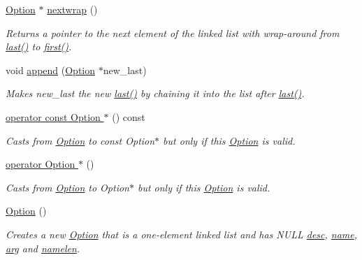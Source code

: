 \begin{DoxyCompactItemize}
\hyperlink{class_option_parser_1_1_option}{Option} $\ast$ \hyperlink{class_option_parser_1_1_option_a3c426f5fa1315b9b474286d7d2d1c277}{nextwrap} ()
\begin{DoxyCompactList}\small\item\em Returns a pointer to the next element of the linked list with wrap-\/around from \hyperlink{class_option_parser_1_1_option_a4c500ad0071e1dc9be2b2b234db71b1d}{last()} to \hyperlink{class_option_parser_1_1_option_aa5f751dbb4de499f2665d4d0b6238037}{first()}. \end{DoxyCompactList}\item 
void \hyperlink{class_option_parser_1_1_option_a47a6a9946633001b36826680252065df}{append} (\hyperlink{class_option_parser_1_1_option}{Option} $\ast$new\-\_\-last)
\begin{DoxyCompactList}\small\item\em Makes {\ttfamily new\-\_\-last} the new \hyperlink{class_option_parser_1_1_option_a4c500ad0071e1dc9be2b2b234db71b1d}{last()} by chaining it into the list after \hyperlink{class_option_parser_1_1_option_a4c500ad0071e1dc9be2b2b234db71b1d}{last()}. \end{DoxyCompactList}\item 
\hyperlink{class_option_parser_1_1_option_a52a071fc38974597b6673ab34725c8d5}{operator const Option $\ast$} () const 
\begin{DoxyCompactList}\small\item\em Casts from \hyperlink{class_option_parser_1_1_option}{Option} to const Option$\ast$ but only if this \hyperlink{class_option_parser_1_1_option}{Option} is valid. \end{DoxyCompactList}\item 
\hyperlink{class_option_parser_1_1_option_a3e135f163c812dbd1c954f8d8d9c8a6e}{operator Option $\ast$} ()
\begin{DoxyCompactList}\small\item\em Casts from \hyperlink{class_option_parser_1_1_option}{Option} to Option$\ast$ but only if this \hyperlink{class_option_parser_1_1_option}{Option} is valid. \end{DoxyCompactList}\item 
\hyperlink{class_option_parser_1_1_option_a688623720b4f2221a82a29014b856d95}{Option} ()
\begin{DoxyCompactList}\small\item\em Creates a new \hyperlink{class_option_parser_1_1_option}{Option} that is a one-\/element linked list and has N\-U\-L\-L \hyperlink{class_option_parser_1_1_option_a9ea2f4b0658ab175b7f0f0c204671fa9}{desc}, \hyperlink{class_option_parser_1_1_option_abea386c9b8b1a810a2eb776d338fdfab}{name}, \hyperlink{class_option_parser_1_1_option_a5b222bff75241e025502aab20a914191}{arg} and \hyperlink{class_option_parser_1_1_option_a25a2b22da7c974be3bcda66f08d2f3f3}{namelen}. \end{DoxyCompactList}\item 

\end{DoxyCompactItemize}

